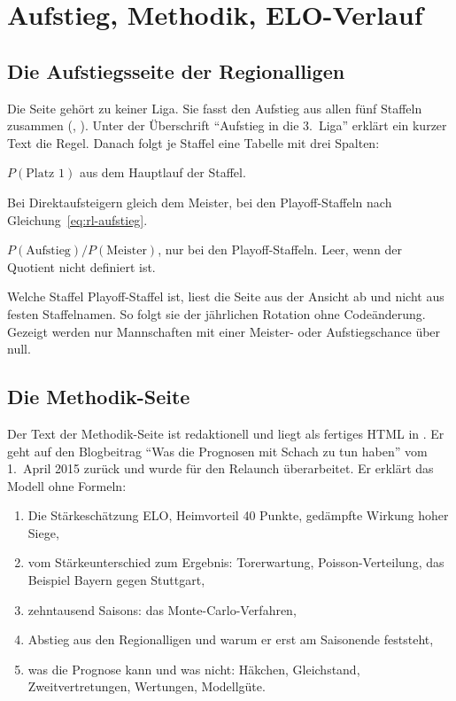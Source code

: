 \chapter{Aufstieg, Methodik, ELO-Verlauf}\label{kap:weitere}

\section{Die Aufstiegsseite der Regionalligen}

Die Seite  gehört zu keiner Liga. Sie fasst den
Aufstieg aus allen fünf Staffeln zusammen
(, ).
Unter der Überschrift \enquote{Aufstieg in die 3.~Liga} erklärt ein kurzer
Text die Regel. Danach folgt je Staffel eine Tabelle mit drei Spalten:

\begin{description}[font=\sffamily\bfseries\small]
  \item[Meister] $P(\text{Platz 1})$ aus dem Hauptlauf der Staffel.
  \item[Aufstieg] Bei Direktaufsteigern gleich dem Meister, bei den
        Playoff-Staffeln nach Gleichung~\eqref{eq:rl-aufstieg}.
  \item[Siegquote] $P(\text{Aufstieg})/P(\text{Meister})$, nur bei den
        Playoff-Staffeln. Leer, wenn der Quotient nicht definiert ist.
\end{description}

Welche Staffel Playoff-Staffel ist, liest die Seite aus der Ansicht ab und
nicht aus festen Staffelnamen. So folgt sie der jährlichen Rotation ohne
Codeänderung. Gezeigt werden nur Mannschaften mit einer Meister- oder
Aufstiegschance über null.


\section{Die Methodik-Seite}

Der Text der Methodik-Seite ist redaktionell und liegt als fertiges HTML in
. Er geht auf den Blogbeitrag
\enquote{Was die Prognosen mit Schach zu tun haben} vom 1.~April 2015 zurück
und wurde für den Relaunch überarbeitet. Er erklärt das Modell ohne Formeln:

\begin{enumerate}
  \item Die Stärkeschätzung ELO, Heimvorteil 40 Punkte, gedämpfte Wirkung
        hoher Siege,
  \item vom Stärkeunterschied zum Ergebnis: Torerwartung, Poisson-Verteilung,
        das Beispiel Bayern gegen Stuttgart,
  \item zehntausend Saisons: das Monte-Carlo-Verfahren,
  \item Abstieg aus den Regionalligen und warum er erst am Saisonende
        feststeht,
  \item was die Prognose kann und was nicht: Häkchen, Gleichstand,
        Zweitvertretungen, Wertungen, Modellgüte.
\end{enumerate}


